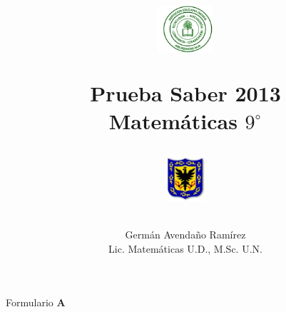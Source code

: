 \documentclass[10pt,letterpaper,addpoints]{exam}
\begin{document}
\title{\begin{minipage}{.2\textwidth}
        \includegraphics[height=1.75cm]{Images/logo-colegio.png}
       \end{minipage}
\begin{minipage}{.55\textwidth}
 \begin{center}
Prueba Saber 2013\\Matemáticas $9^{\circ}$
\end{center}
\end{minipage}
\begin{minipage}{.2\textwidth}
\includegraphics[height=1.75cm]{Images/logo-sed.png} 
\end{minipage}
}
\author{Germ\'{a}n Avendaño Ram\'{i}rez\\Lic. Matemáticas U.D., M.Sc. U.N.}
\date{}
\maketitle
\begin{center}
\end{center}
\begin{center}
Formulario \textbf{A}
\end{center}
\setlength{\columnsep}{2pc}
\end{document}
